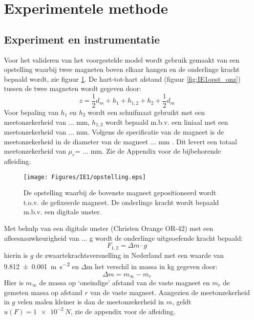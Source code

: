 \section{Experimentele methode}
\subsection{Experiment en instrumentatie}
Voor het valideren van het voorgestelde model wordt gebruik gemaakt van een opstelling waarbij twee magneten boven elkaar hangen en de onderlinge kracht bepaald wordt, zie figuur \ref{fig:IE1opstelling}. De hart-tot-hart afstand (figuur \ref{fig:IE1opst_onz}) tussen de twee magneten wordt gegeven door:
%
\begin{equation}
z=\frac{1}{2} d_{m}+h_{1}+h_{1,2}+h_{2}+\frac{1}{2} d_{m}
\label{eq:afstanden}
\end{equation}
%
Voor bepaling van $h_1$ en $h_2$ wordt een schuifmaat \href{https://youtu.be/eBG2Y0nXGAs}{\faCamera} gebruikt met een meetonzekerheid van ... mm, $h_{1,2}$ wordt bepaald m.b.v. een liniaal met een meetonzekerheid van ... mm. Volgens de specificatie van de magneet is de meetonzekerheid in de diameter van de magneet ... mm \citep{supermagnete_data_sheet_s-10-05-npdf_2011}. Dit levert een totaal meetonzekerheid van $\mu_r$= ... mm. Zie de Appendix voor de bijbehorende afleiding.

\begin{figure}[h!]
    \centering
    \texttt{[image: Figures/IE1/opstelling.eps]}
    \caption{De opstelling waarbij de bovenste magneet gepositioneerd wordt t.o.v. de gefixeerde magneet. De onderlinge kracht wordt bepaald m.b.v. een digitale unster.}
    \label{fig:IE1opstelling}
\end{figure}

Met behulp van een digitale unster (Christen Orange OR-42) met een afleesnauwkeurigheid van ... g wordt de onderlinge uitgeoefende kracht bepaald:
%
\begin{equation}\label{eq:Fz}
F_{1,2}=\Delta m \cdot g
\end{equation}
%
hierin is $g$ de zwaartekrachtsversnelling in Nederland met een waarde van \SI{9.812\pm 0.001}{m\per s^2} en $\Delta$m het verschil in massa in kg gegeven door:
%
\begin{equation}
\Delta m=m_{\infty}-m_{r}
\end{equation}
%
Hier is $m_{\infty}$ de massa op ‘oneindige’ afstand van de vaste magneet en $m_r$ de gemeten massa op afstand $r$ van de vaste magneet.
Aangezien de meetonzekerheid in $g$ velen malen kleiner is dan de meetonzekerheid in $m$, geldt 
$u(F) = \SI{1e-2}{N}$, zie de appendix voor de afleiding.

